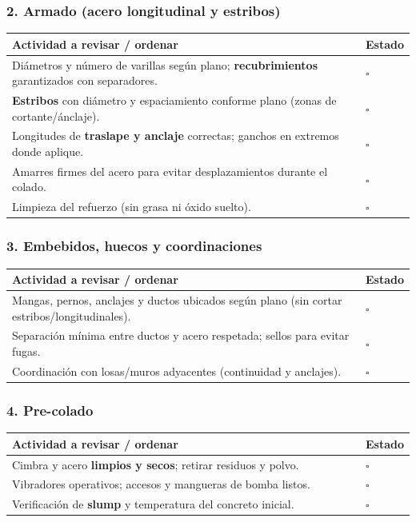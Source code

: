 \documentclass[12pt]{article}
\newcommand{\cbox}{\(\square\)}
\renewcommand{\cbox}{\(\square\)} %
\begin{document}
	\subsubsection*{2. Armado (acero longitudinal y estribos)}
	\begin{tabularx}{\linewidth}{>{\raggedright\arraybackslash}p{0.93\linewidth} >{\centering\arraybackslash}m{0.07\linewidth}}
		\toprule
		\textbf{Actividad a revisar / ordenar} & \textbf{Estado}\\
		\midrule
		Diámetros y número de varillas según plano; \textbf{recubrimientos} garantizados con separadores. & \cbox \\
		\textbf{Estribos} con diámetro y espaciamiento conforme plano (zonas de cortante/ánclaje). & \cbox \\
		Longitudes de \textbf{traslape y anclaje} correctas; ganchos en extremos donde aplique. & \cbox \\
		Amarres firmes del acero para evitar desplazamientos durante el colado. & \cbox \\
		Limpieza del refuerzo (sin grasa ni óxido suelto). & \cbox \\
		\bottomrule
	\end{tabularx}
	
	\subsubsection*{3. Embebidos, huecos y coordinaciones}
	\begin{tabularx}{\linewidth}{>{\raggedright\arraybackslash}p{0.93\linewidth} >{\centering\arraybackslash}m{0.07\linewidth}}
		\toprule
		\textbf{Actividad a revisar / ordenar} & \textbf{Estado}\\
		\midrule
		Mangas, pernos, anclajes y ductos ubicados según plano (sin cortar estribos/longitudinales). & \cbox \\
		Separación mínima entre ductos y acero respetada; sellos para evitar fugas. & \cbox \\
		Coordinación con losas/muros adyacentes (continuidad y anclajes). & \cbox \\
		\bottomrule
	\end{tabularx}
	
	\subsubsection*{4. Pre-colado}
	\begin{tabularx}{\linewidth}{>{\raggedright\arraybackslash}p{0.93\linewidth} >{\centering\arraybackslash}m{0.07\linewidth}}
		\toprule
		\textbf{Actividad a revisar / ordenar} & \textbf{Estado}\\
		\midrule
		Cimbra y acero \textbf{limpios y secos}; retirar residuos y polvo. & \cbox \\
		Vibradores operativos; accesos y mangueras de bomba listos. & \cbox \\
		Verificación de \textbf{slump} y temperatura del concreto inicial. & \cbox \\
		\bottomrule
	\end{tabularx}
	
\end{document}
